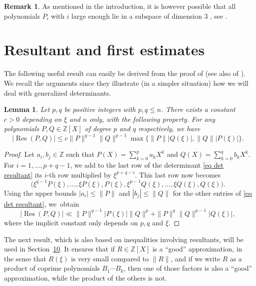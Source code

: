 \documentclass[10pt,a4paper]{amsart}
\numberwithin{equation}{section}
\DeclareMathOperator\Res{Res}
\newcommand\bZ{\mathbb{Z}}
\newcommand{\normH}[1]{\|#1\|}
\theoremstyle{definition}
\newtheorem{Rem}[Def]{Remark}
\theoremstyle{plain}
\newtheorem{Lem}[Def]{Lemma}
\begin{document}
\begin{Rem}
As mentioned in the introduction, it is however possible that all polynomials $P_i$ with $i$ large enough lie in a subspace of dimension $3$ , see \cite[Th.\,1.3]{moshchevitin2007best}.
\end{Rem}

\section{Resultant and first estimates}
\label{section: resultant et premier resultat}

The following useful result can easily be derived from the proof of \cite[\S 5]{davenport1969approximation} (see also of \cite[Lem.\,1]{brownawell1974sequences}). We recall the arguments since they illustrate (in a simpler situation) how we will deal with generalized determinants.

\begin{Lem}
\label{lem: estimation classique du resultant}
Let $p,q$ be positive integers with $p,q\leq n$. There exists a constant $c>0$ depending on $\xi$ and $n$ only, with the following property. For any polynomials $P,Q\in\bZ[X]$ of degree $p$ and $q$ respectively, we have
\begin{equation*}
|\Res(P,Q)| \leq c \normH{P}^{q-1}\normH{Q}^{p-1} \max\big\{\normH{P}|Q(\xi)|, \normH{Q}|P(\xi)| \big\}.
\end{equation*}
\end{Lem}

\begin{proof}
Let $a_i,b_j\in \bZ$ such that $P(X) = \sum_{k=0}^{p} a_kX^k$ and $Q(X) = \sum_{k=0}^{q} b_kX^k$. For $i=1,\dots,p+q-1$, we add to the last row of the determinant \eqref{eq det resultant} its $i$-th row multiplied by $\xi^{p+q-i}$. This last row now becomes
\begin{equation*}
\Big(\xi^{q-1}P(\xi), \dots, \xi P(\xi), P(\xi), \xi^{p-1}Q(\xi), \dots, \xi Q(\xi), Q(\xi)\Big).
\end{equation*}
Using the upper bounds $|a_i| \leq \normH{P}$ and $|b_j|\leq \normH{Q}$ for the other entries of \eqref{eq det resultant}, we~obtain
\begin{equation*}
|\Res(P,Q)| \ll \normH{P}^{q-1}|P(\xi)| \normH{Q}^p + \normH{P}^q\normH{Q}^{p-1}|Q(\xi)|,
\end{equation*}
where the implicit constant only depends on $p, q$ and $\xi$.
\end{proof}

The next result, which is also based on inequalities involving resultants, will be used in Section~\href{https://jep.centre-mersenne.org/item/10.5802/jep.265.pdf#page=27}{10}. It ensures that if $R\in\bZ[X]$ is a ``good'' approximation, in the sense that $R(\xi)$ is very small compared to $\normH{R}$, and if we write $R$ as a product of coprime polynomials $B_1\cdots B_k$, then one of those factors is also a ``good'' approximation, while the product of the others is not.
\end{document}
